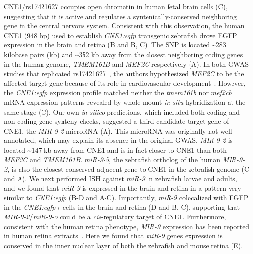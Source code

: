 CNE1/rs17421627 occupies open chromatin in human fetal brain cells (C), suggesting that it is active and regulates a syntenically-conserved
neighboring gene in the central nervous system. Consistent with this
observation, the human CNE1 (948 bp) used to establish \emph{CNE1:egfp}
transgenic zebrafish drove EGFP expression in the brain and retina (B and B, C). The SNP is located \textasciitilde{}283 kilobase pairs (kb) and
\textasciitilde{}352 kb away from the closest neighboring coding genes in
the human genome, \emph{TMEM161B} and \emph{MEF2C} respectively (A). In both GWAS studies that replicated rs17421627~\citep{Ikram:2010gv, Sim:2013fm}, the authors
hypothesized \emph{MEF2C} to be the affected target gene because of its
role in cardiovascular development~\citep{Lin:1997vi}. However, the \emph{CNE1:egfp} expression profile matched
neither the \emph{tmem161b} nor \emph{mef2cb} mRNA expression patterns
revealed by whole mount \emph{in situ} hybridization at the same stage
(C). Our own \emph{in silico} predictions, which included both coding and non-coding
gene synteny checks, suggested a third candidate target gene of CNE1,
the \emph{MIR-9-2} microRNA (A). This microRNA was originally not
well annotated, which may explain its absence in the original GWAS.
\emph{MIR-9-2} is located \textasciitilde{}147 kb away from CNE1 and is
in fact closer to CNE1 than both \emph{MEF2C} and \emph{TMEM161B}.
\emph{miR-9-5}, the zebrafish ortholog of the human \emph{MIR-9-2}, is
also the closest conserved adjacent gene to CNE1 in the zebrafish genome
(C and A). We next performed ISH against \emph{miR-9} in
zebrafish larvae and adults, and we found that \emph{miR-9} is expressed
in the brain and retina in a pattern very similar to \emph{CNE1:egfp}
(B-D and A-C). Importantly, \emph{miR-9} colocalized with
EGFP in the \emph{CNE1:egfp+} cells in the brain and retina (D and
B, C), supporting that \emph{MIR-9-2}/\emph{miR-9-5} could be a
\emph{cis}-regulatory target of CNE1. Furthermore, consistent with the
human retina phenotype, \emph{MIR-9} expression has been reported in human
retina extracts~\citep{Karali:2016db}.
Here we found that \emph{miR-9} genes expression is conserved in the
inner nuclear layer of both the zebrafish and mouse retina (E).

